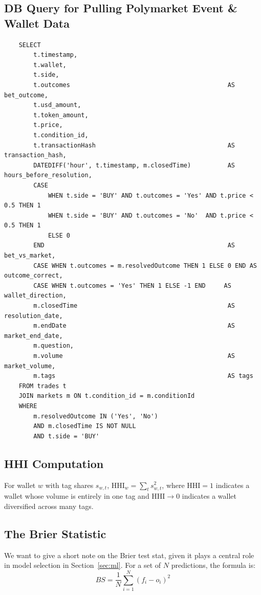 \documentclass[11pt,a4paper]{article}
\begin{document}
\subsection{DB Query for Pulling Polymarket Event \& Wallet Data}
\label{sec:DB_Query}
\begin{verbatim}
    SELECT
        t.timestamp,
        t.wallet,
        t.side,
        t.outcomes                                           AS bet_outcome,
        t.usd_amount,
        t.token_amount,
        t.price,
        t.condition_id,
        t.transactionHash                                    AS transaction_hash,
        DATEDIFF('hour', t.timestamp, m.closedTime)          AS hours_before_resolution,
        CASE
            WHEN t.side = 'BUY' AND t.outcomes = 'Yes' AND t.price < 0.5 THEN 1
            WHEN t.side = 'BUY' AND t.outcomes = 'No'  AND t.price < 0.5 THEN 1
            ELSE 0
        END                                                  AS bet_vs_market,
        CASE WHEN t.outcomes = m.resolvedOutcome THEN 1 ELSE 0 END AS outcome_correct,
        CASE WHEN t.outcomes = 'Yes' THEN 1 ELSE -1 END     AS wallet_direction,
        m.closedTime                                         AS resolution_date,
        m.endDate                                            AS market_end_date,
        m.question,
        m.volume                                             AS market_volume,
        m.tags                                               AS tags
    FROM trades t
    JOIN markets m ON t.condition_id = m.conditionId
    WHERE
        m.resolvedOutcome IN ('Yes', 'No')
        AND m.closedTime IS NOT NULL
        AND t.side = 'BUY'
\end{verbatim}

\subsection{HHI Computation}
\label{sec:hhi_append}
For wallet $w$ with tag shares $s_{w,t}$, $\text{HHI}_w = \sum_t s_{w,t}^2$, where $\text{HHI}=1$ indicates a wallet whose volume is entirely in one tag and $\text{HHI}\to 0$ indicates a wallet diversified across many tags. 

\subsection{The Brier Statistic}
We want to give a short note on the Brier test stat, given it plays a central role in model selection in Section~\ref{sec:ml}. For a set of $N$ predictions, the formula is:
\[
BS = \frac{1}{N} \sum_{i=1}^{N} (f_i - o_i)^2
\]
\end{document}

